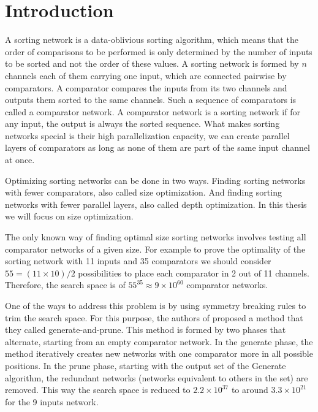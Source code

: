 \documentclass[../main.tex]{subfiles}
\begin{document}
\section{Introduction}
A sorting network is a data-oblivious sorting algorithm, which means that the order of comparisons to be performed is only determined by the number of inputs to be sorted and not the order of these values. A sorting network is formed by $n$ channels each of them carrying one input, which are connected pairwise by comparators. A comparator compares the inputs from its two channels and 
outputs them sorted to the same channels. Such a sequence of comparators is called a comparator network. A comparator network is a sorting network if for any input, the output is always the sorted sequence. What makes sorting networks special is their high parallelization capacity, we can create parallel layers of comparators as long as none of them are part of
the same input channel at once.

Optimizing sorting networks can be done in two ways. Finding sorting networks with fewer comparators,
also called size optimization. And finding sorting networks with fewer parallel layers, also called depth optimization.
In this thesis we will focus on size optimization.

The only known way of finding optimal size sorting networks involves testing all comparator networks of a given size. 
For example to prove the optimality of the sorting network
with 11 inputs and 35 comparators we should consider $55 = (11 \times 10)/2$ possibilities to place each comparator in 2 out of 11 channels. Therefore, the search space is of $55^{35} \approx 9 \times 10^{60}$ comparator networks. 

One of the ways to address this problem is by using symmetry breaking rules to trim the search space. For this purpose, the authors of \cite{sortingnineinputs} proposed a method that they called generate-and-prune. This method is formed by two phases that alternate, starting from an empty comparator network.
In the generate phase, the method iteratively creates new networks with one comparator more in all possible positions. In the prune phase, starting with the output set of the Generate algorithm, the redundant networks (networks equivalent to others in the set) are removed. This way the search space is reduced to $2.2 \times 10^{37}$ to around $3.3 \times 10^{21}$ for the 9 inputs network.
\end{document}

